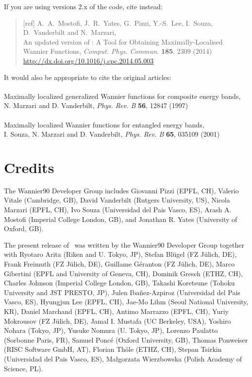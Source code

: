 If you are using versions 2.x of the code, cite instead:  
\begin{quote}
[ref] A.~A.~Mostofi, J.~R.~Yates, G.~Pizzi, Y.-S.~Lee, I.~Souza, D.~Vanderbilt
and N.~Marzari,\\
An updated version of \wannier: 
A Tool for Obtaining Maximally-Localised Wannier
  Functions, {\it Comput. Phys. Commun.} {\bf 185}, 2309 (2014)\\
\url{http://dx.doi.org/10.1016/j.cpc.2014.05.003}

\end{quote}                                                              

It would also be appropriate to cite the original articles:\\\\
Maximally localized generalized Wannier functions for composite
  energy bands,\\ 
N. Marzari and D. Vanderbilt, {\it Phys. Rev. B} {\bf 56}, 12847 (1997)\\\\
Maximally localized Wannier functions for entangled energy bands,\\
I. Souza, N. Marzari and D. Vanderbilt, {\it Phys. Rev. B} {\bf 65}, 035109 (2001)


\section*{Credits}
The Wannier90 Developer Group includes Giovanni Pizzi (EPFL, CH), 
Valerio Vitale (Cambridge, GB),
David Vanderbilt  (Rutgers University, US),
Nicola Marzari    (EPFL, CH),
Ivo Souza         (Universidad del Pais Vasco, ES),
Arash A. Mostofi  (Imperial College London, GB), and 
Jonathan R. Yates (University of Oxford, GB).

The present release of \wannier\ was written by the Wannier90 Developer Group together
with Ryotaro Arita (Riken and U. Tokyo, JP),
Stefan Bl\"ugel (FZ  J\"ulich, DE),
Frank Freimuth (FZ  J\"ulich, DE),
Guillame G\'eranton (FZ  J\"ulich, DE),
Marco Gibertini (EPFL and University of Geneva, CH),
Dominik Gresch (ETHZ, CH),
Charles Johnson (Imperial College London, GB),
Takashi Koretsune (Tohoku University and JST PRESTO, JP),
Julen Iba\~nez-Azpiroz (Universidad del Pais Vasco, ES),
Hyungjun Lee (EPFL, CH),
Jae-Mo Lihm (Seoul National University, KR),
Daniel Marchand (EPFL, CH),
Antimo Marrazzo (EPFL, CH),
Yuriy Mokrousov (FZ  J\"ulich, DE),
Jamal I. Mustafa (UC Berkeley, USA),
Yoshiro Nohara (Tokyo, JP),
Yusuke Nomura (U. Tokyo, JP),
Lorenzo Paulatto (Sorbonne Paris, FR),
Samuel Ponc\'e (Oxford University, GB),
Thomas Ponweiser (RISC Software GmbH, AT),
Florian Th\"ole (ETHZ, CH),
Stepan Tsirkin (Universidad del Pais Vasco, ES),
Ma\l{}gorzata Wierzbowska (Polish Academy of Science, PL).

